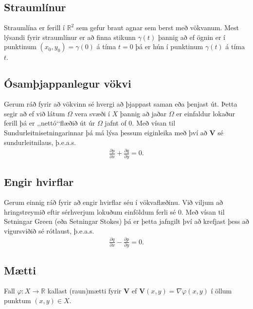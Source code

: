 \documentclass[a4paper,10pt,icelandic]{sphinxmanual}
\begin{document}
\subsection{Straumlínur}
\label{\detokenize{Kafli05:straumlinur}}
Straumlína er ferill í \({\mathbb{R}}^2\) sem gefur braut agnar sem berst með vökvanum. Mest lýsandi fyrir straumlínur er að finna stikunn \(\gamma(t)\) þannig að ef ögnin er í punktinum \((x_0, y_0)=\gamma(0)\) á tíma \(t=0\) þá er hún í punktinum \(\gamma(t)\) á tíma \(t\).


\subsection{Ósamþjappanlegur vökvi}
\label{\detokenize{Kafli05:osamjappanlegur-vokvi}}
Gerum ráð fyrir að vökvinn sé hvergi að þjappast saman eða þenjast út. Þetta segir að ef við látum \(\Omega\) vera svæði í \(X\) þannig að jaðar \(\Omega\) er einfaldur lokaður ferill þá er ,,nettó‘‘flæðið út úr \(\Omega\) jafnt of 0. Með vísan til Sundurleitnisetningarinnar þá má lýsa þessum eiginleika með því að \({\mathbf V}\) sé sundurleitnilaus, þ.e.a.s.
\begin{equation*}
\begin{split}\frac{\partial p}{\partial x}+ \frac{\partial q}{\partial y}=0.\end{split}
\end{equation*}

\subsection{Engir hvirflar}
\label{\detokenize{Kafli05:engir-hvirflar}}
Gerum einnig ráð fyrir að engir hvirflar séu í vökvaflæðinu. Við viljum að hringstreymið eftir sérhverjum lokuðum einföldum ferli sé 0. Með vísan til Setningar Green (eða Setningar Stokes) þá er þetta jafngilt því að krefjast þess að vigursviðið sé rótlaust, þ.e.a.s.
\begin{equation*}
\begin{split}\frac{\partial q}{\partial x}-\frac{\partial p}{\partial y}=0.\end{split}
\end{equation*}

\subsection{Mætti}
\label{\detokenize{Kafli05:maetti}}
Fall \(\varphi:X\to {\mathbb{R}}\) kallast (raun)mætti fyrir \({\mathbf V}\) ef \({\mathbf V}(x,y)=\nabla\varphi(x,y)\) í öllum punktum \((x,y)\in X\).
\end{document}
